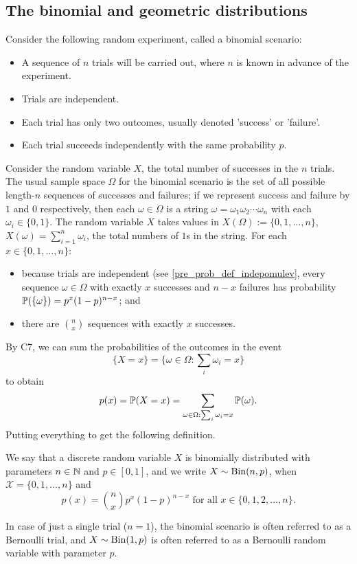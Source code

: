 \documentclass[10pt, a4paper]{article}
\begin{document}
\subsection{The binomial and geometric distributions}
Consider the following random experiment,
called a binomial scenario:
\begin{itemize}
    \item A sequence of $n$ trials will be carried out, where $n$ is known in advance of the experiment.
    \item Trials are independent.
    \item Each trial has only two outcomes, usually denoted 'success' or 'failure'.
    \item Each trial succeeds independently with the same probability $p$.
\end{itemize}
Consider the random variable $X$, the total number of successes in the $n$ trials.
The usual sample space $\Omega$ for the binomial scenario is the set of all possible length-$n$ sequences of successes and failures; if we represent success and failure by $1$ and $0$ respectively, then each $\omega \in \Omega$ is a string 
$\omega = \omega_1 \omega_2 \dotsi \omega_n$ with each $\omega_i \in \{0, 1\}$.
The random variable $X$ takes values in $X(\Omega) := \{0, 1, \dotsc, n\}$,
$X(\omega) = \sum_{i = 1}^{n}\omega_i$, the total numbers of $1$s in the string.
For each $x \in \{0, 1, \dotsc, n\}$:
\begin{itemize}
    \item because trials are independent (see \autoref{pre_prob_def_indepomulev}, every sequence $\omega \in \Omega$ with exactly $x$ successes and $n - x$ failures has probability $\P(\{\omega\}) = p ^ x (1 - p) ^ {n - x}$; and
    \item there are $\binom{n}{x}$ sequences with exactly $x$ successes.
\end{itemize}
By C7, we can sum the probabilities of the outcomes in the event
\[
\{X = x\} = \{\omega \in \Omega : \sum_i \omega_i = x\}
\]
to obtain
\[
p(x) = \P(X = x) = \sum_{\omega \in \Omega: \sum_i \omega_i = x}\P(\omega).
\]
Putting everything to get the following definition.
\begin{definition}
    We say that a discrete random variable $X$ is binomially distributed with parameters $n \in \N$ and $p \in [0, 1]$,
    and we write $X \sim \Bin(n, p)$,
    when $\mathcal{X} = \{0, 1, \dotsc, n\}$ and
    \[
    p(x) = \binom{n}{x}p ^ x (1 - p) ^ {n - x}\text{ for all } x \in \{0, 1, 2, \dotsc, n\}.
    \]
\end{definition}
In case of just a single trial ($n = 1$),
the binomial scenario is often referred to as a Bernoulli trial,
and $X \sim \Bin(1, p)$ is often referred to as a Bernoulli random variable with parameter $p$.
\end{document}
